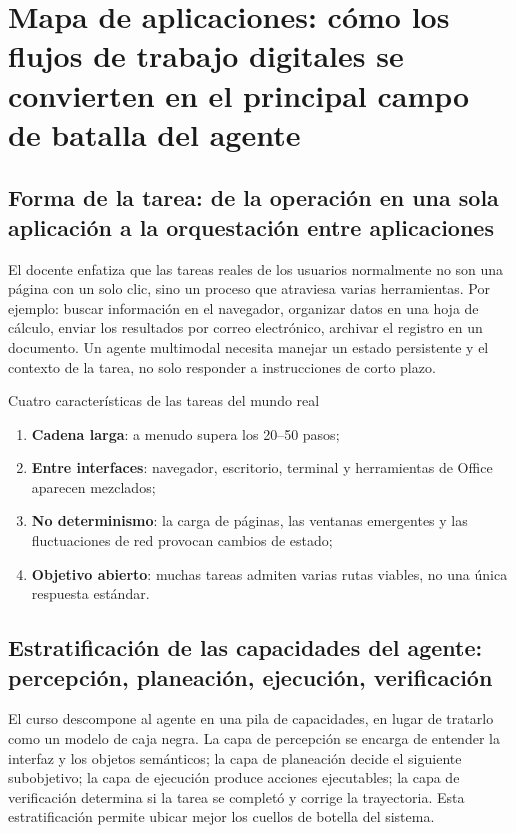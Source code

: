\section{Mapa de aplicaciones: cómo los flujos de trabajo digitales se convierten en el principal campo de batalla del agente}

\subsection{Forma de la tarea: de la operación en una sola aplicación a la orquestación entre aplicaciones}
El docente enfatiza que las tareas reales de los usuarios normalmente no son una página con un solo clic, sino un proceso que atraviesa varias herramientas. Por ejemplo: buscar información en el navegador, organizar datos en una hoja de cálculo, enviar los resultados por correo electrónico, archivar el registro en un documento. Un agente multimodal necesita manejar un estado persistente y el contexto de la tarea, no solo responder a instrucciones de corto plazo.

\begin{importantbox}{Cuatro características de las tareas del mundo real}
\begin{enumerate}
    \item \textbf{Cadena larga}: a menudo supera los 20--50 pasos;
    \item \textbf{Entre interfaces}: navegador, escritorio, terminal y herramientas de Office aparecen mezclados;
    \item \textbf{No determinismo}: la carga de páginas, las ventanas emergentes y las fluctuaciones de red provocan cambios de estado;
    \item \textbf{Objetivo abierto}: muchas tareas admiten varias rutas viables, no una única respuesta estándar.
\end{enumerate}
\end{importantbox}

\subsection{Estratificación de las capacidades del agente: percepción, planeación, ejecución, verificación}
El curso descompone al agente en una pila de capacidades, en lugar de tratarlo como un modelo de caja negra. La capa de percepción se encarga de entender la interfaz y los objetos semánticos; la capa de planeación decide el siguiente subobjetivo; la capa de ejecución produce acciones ejecutables; la capa de verificación determina si la tarea se completó y corrige la trayectoria. Esta estratificación permite ubicar mejor los cuellos de botella del sistema.

